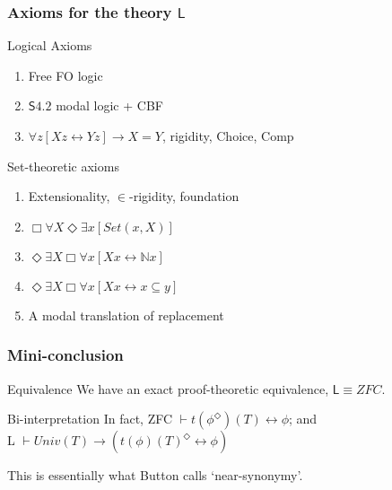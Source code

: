 \documentclass{beamer}
\begin{document}
\begin{frame}
    \frametitle{Axioms for the theory $\mathsf{L}$}
    \begin{block}{Logical Axioms}
    \begin{enumerate}
        \item Free FO logic
        \item $\mathsf{S4.2}$ modal logic + CBF
        \item $\forall z[Xz \leftrightarrow Yz] \rightarrow X = Y$, rigidity,
        Choice, Comp
    \end{enumerate}
    \end{block}
    \begin{block}{Set-theoretic axioms}
        \begin{enumerate}
        \item Extensionality, $\in$-rigidity, foundation
        \item $\Box \forall X \Diamond \exists x [Set(x, X)]$
        \item $\Diamond \exists X \Box \forall x[Xx \leftrightarrow \mathbb{N}x]$
        \item $\Diamond \exists X \Box \forall x[Xx \leftrightarrow x \subseteq y]$
        \item A modal translation of replacement
        \end{enumerate}
    \end{block}
\end{frame}

\begin{frame}
    \frametitle{Mini-conclusion}
\begin{block}{Equivalence}
    We have an exact proof-theoretic equivalence, $\mathsf{L} \equiv ZFC$.
\end{block}
\begin{block}{Bi-interpretation}
    In fact, ZFC $\vdash t(\phi^\Diamond)(T) \leftrightarrow \phi$;
    and \\ L $\vdash Univ(T) \rightarrow (t(\phi)(T)^\Diamond \leftrightarrow \phi)$
\end{block}
This is essentially what Button calls `near-synonymy'.
\end{frame}
\end{document}
